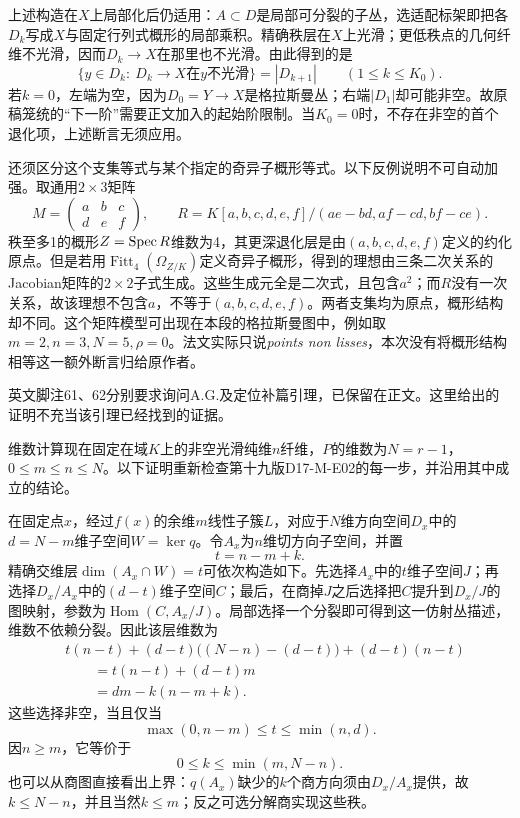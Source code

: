 上述构造在$X$上局部化后仍适用：$A\subset D$是局部可分裂的子丛，选适配标架即把各$D_k$写成$X$与固定行列式概形的局部乘积。精确秩层在$X$上光滑；更低秩点的几何纤维不光滑，因而$D_k\to X$在那里也不光滑。由此得到的是
\[
\{y\in D_k:\ D_k\to X\text{在}y\text{不光滑}\}
=|D_{k+1}|\qquad(1\leq k\leq K_0).
\]
若$k=0$，左端为空，因为$D_0=Y\to X$是格拉斯曼丛；右端$|D_1|$却可能非空。故原稿笼统的“下一阶”需要正文加入的起始阶限制。当$K_0=0$时，不存在非空的首个退化项，上述断言无须应用。

还须区分这个支集等式与某个指定的奇异子概形等式。以下反例说明不可自动加强。取通用$2\times3$矩阵
\[
M=\begin{pmatrix}a&b&c\\d&e&f\end{pmatrix},\qquad
R=K[a,b,c,d,e,f]/(ae-bd,af-cd,bf-ce).
\]
秩至多1的概形$Z=\operatorname{Spec} R$维数为4，其更深退化层是由$(a,b,c,d,e,f)$定义的约化原点。但是若用$\operatorname{Fitt}_4(\Omega_{Z/K})$定义奇异子概形，得到的理想由三条二次关系的Jacobian矩阵的$2\times2$子式生成。这些生成元全是二次式，且包含$a^2$；而$R$没有一次关系，故该理想不包含$a$，不等于$(a,b,c,d,e,f)$。两者支集均为原点，概形结构却不同。这个矩阵模型可出现在本段的格拉斯曼图中，例如取$m=2,n=3,N=5,\rho=0$。法文实际只说\emph{points non lisses}，本次没有将概形结构相等这一额外断言归给原作者。

英文脚注61、62分别要求询问A.G.及定位补篇引理，已保留在正文。这里给出的证明不充当该引理已经找到的证据。

维数计算现在固定在域$K$上的非空光滑纯维$n$纤维，$P$的维数为$N=r-1$，$0\leq m\leq n\leq N$。以下证明重新检查第十九版D17-M-E02的每一步，并沿用其中成立的结论。

在固定点$x$，经过$f(x)$的余维$m$线性子簇$L$，对应于$N$维方向空间$D_x$中的$d=N-m$维子空间$W=\ker q$。令$A_x$为$n$维切方向子空间，并置
\[
t=n-m+k.
\]
精确交维层$\dim(A_x\cap W)=t$可依次构造如下。先选择$A_x$中的$t$维子空间$J$；再选择$D_x/A_x$中的$(d-t)$维子空间$C$；最后，在商掉$J$之后选择把$C$提升到$D_x/J$的图映射，参数为$\operatorname{Hom}(C,A_x/J)$。局部选择一个分裂即可得到这一仿射丛描述，维数不依赖分裂。因此该层维数为
\begin{align*}
&t(n-t)+(d-t)\bigl((N-n)-(d-t)\bigr)+(d-t)(n-t)\\
&\hspace{2em}=t(n-t)+(d-t)m\\
&\hspace{2em}=dm-k(n-m+k).
\end{align*}
这些选择非空，当且仅当
\[
\max(0,n-m)\leq t\leq\min(n,d).
\]
因$n\geq m$，它等价于
\[
0\leq k\leq\min(m,N-n).
\]
也可以从商图直接看出上界：$q(A_x)$缺少的$k$个商方向须由$D_x/A_x$提供，故$k\leq N-n$，并且当然$k\leq m$；反之可选分解商实现这些秩。


